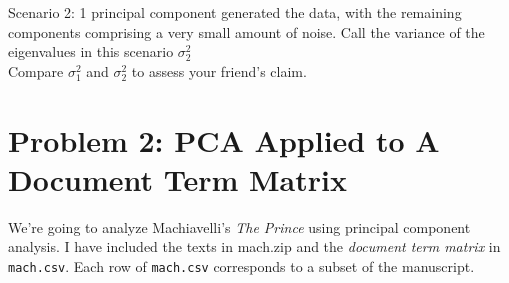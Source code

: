 \documentclass[letterpaper,12pt]{article}
\numberwithin{equation}{section}
\numberwithin{equation}{section}
\begin{document}
Scenario 2: 1 principal component generated the data, with the remaining components comprising a very small amount of noise.  Call the variance of the eigenvalues in this scenario $\sigma^2_{2}$\\


Compare $\sigma_{1}^2$ and $\sigma_{2}^2$ to assess your friend's claim.  


\section*{Problem 2: PCA Applied to A Document Term Matrix}

We're going to analyze Machiavelli's \emph{The Prince} using principal component analysis.  I have included the texts in mach.zip and the \emph{document term matrix} in {\tt mach.csv}.  Each row of {\tt mach.csv} corresponds to a subset of the manuscript.  
\end{document}
